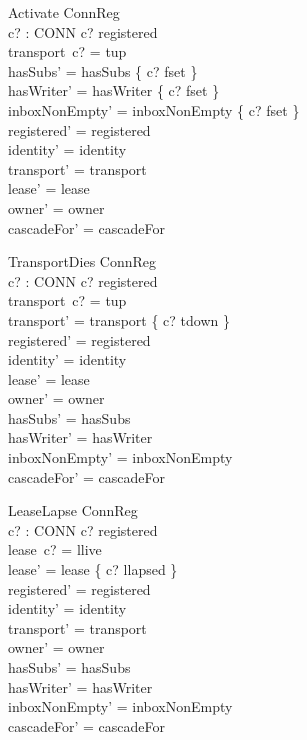 \documentclass[a4paper,10pt,fleqn]{article}
\begin{document}
\begin{schema}{Activate}
  \Delta ConnReg \\
  c? : CONN
\where
  c? \in registered \\
  transport~c? = tup \\
  hasSubs' = hasSubs \oplus \{ c? \mapsto fset \} \\
  hasWriter' = hasWriter \oplus \{ c? \mapsto fset \} \\
  inboxNonEmpty' = inboxNonEmpty \oplus \{ c? \mapsto fset \} \\
  registered' = registered \\
  identity' = identity \\
  transport' = transport \\
  lease' = lease \\
  owner' = owner \\
  cascadeFor' = cascadeFor
\end{schema}

\begin{schema}{TransportDies}
  \Delta ConnReg \\
  c? : CONN
\where
  c? \in registered \\
  transport~c? = tup \\
  transport' = transport \oplus \{ c? \mapsto tdown \} \\
  registered' = registered \\
  identity' = identity \\
  lease' = lease \\
  owner' = owner \\
  hasSubs' = hasSubs \\
  hasWriter' = hasWriter \\
  inboxNonEmpty' = inboxNonEmpty \\
  cascadeFor' = cascadeFor
\end{schema}

\begin{schema}{LeaseLapse}
  \Delta ConnReg \\
  c? : CONN
\where
  c? \in registered \\
  lease~c? = llive \\
  lease' = lease \oplus \{ c? \mapsto llapsed \} \\
  registered' = registered \\
  identity' = identity \\
  transport' = transport \\
  owner' = owner \\
  hasSubs' = hasSubs \\
  hasWriter' = hasWriter \\
  inboxNonEmpty' = inboxNonEmpty \\
  cascadeFor' = cascadeFor
\end{schema}
\end{document}
